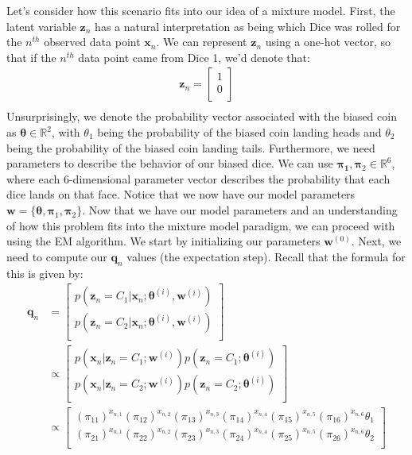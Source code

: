 Let's consider how this scenario fits into our idea of a mixture model. First, the latent variable $\textbf{z}_n$ has a natural interpretation as being which Dice was rolled for the $n^{th}$ observed data point $\textbf{x}_n$. We can represent $\textbf{z}_n$ using a one-hot vector, so that if the $n^{th}$ data point came from Dice 1, we'd denote that:
\begin{align*}
    \textbf{z}_n =
        \begin{bmatrix}
            1 \\
            0 \\
        \end{bmatrix} \\
\end{align*}
Unsurprisingly, we denote the probability vector associated with the biased coin as $\boldsymbol{\theta} \in \mathbb{R}^{2}$, with $\theta_1$ being the probability of the biased coin landing heads and $\theta_2$ being the probability of the biased coin landing tails.
Furthermore, we need parameters to describe the behavior of our biased dice. We can use $\boldsymbol{\pi_1}, \boldsymbol{\pi}_2 \in \mathbb{R}^{6}$, where each 6-dimensional parameter vector describes the probability that each dice lands on that face. Notice that we now have our model parameters $\textbf{w} = \{\boldsymbol{\theta}, \boldsymbol{\pi}_1, \boldsymbol{\pi}_2 \}$.
Now that we have our model parameters and an understanding of how this problem fits into the mixture model paradigm, we can proceed with using the EM algorithm.
We start by initializing our parameters $\textbf{w}^{(0)}$.
Next, we need to compute our $\textbf{q}_n$ values (the expectation step). Recall that the formula for this is given by:
\begin{align} \label{E-for-multinomial}
    \textbf{q}_n &= \begin{bmatrix}
                p(\textbf{z}_n = C_1 | \textbf{x}_n; \boldsymbol{\theta}^{(i)}, \textbf{w}^{(i)}) \\
                p(\textbf{z}_n = C_2 | \textbf{x}_n; \boldsymbol{\theta}^{(i)}, \textbf{w}^{(i)}) \\
            \end{bmatrix} \\
            &\propto \begin{bmatrix}
            p(\textbf{x}_n | \textbf{z}_n = C_1; \textbf{w}^{(i)})p(\textbf{z}_n = C_1; \boldsymbol{\theta}^{(i)}) \\
            p(\textbf{x}_n | \textbf{z}_n = C_2; \textbf{w}^{(i)})p(\textbf{z}_n = C_2; \boldsymbol{\theta}^{(i)}) \\
        \end{bmatrix} \\
        &\propto \begin{bmatrix}
            (\pi_{11})^{x_{n,1}}(\pi_{12})^{x_{n,2}}(\pi_{13})^{x_{n,3}}(\pi_{14})^{x_{n,4}}(\pi_{15})^{x_{n,5}}(\pi_{16})^{x_{n,6}}\theta_1 \\
            (\pi_{21})^{x_{n,1}}(\pi_{22})^{x_{n,2}}(\pi_{23})^{x_{n,3}}(\pi_{24})^{x_{n,4}}(\pi_{25})^{x_{n,5}}(\pi_{26})^{x_{n,6}}\theta_2 \\
        \end{bmatrix} \\
\end{align}
